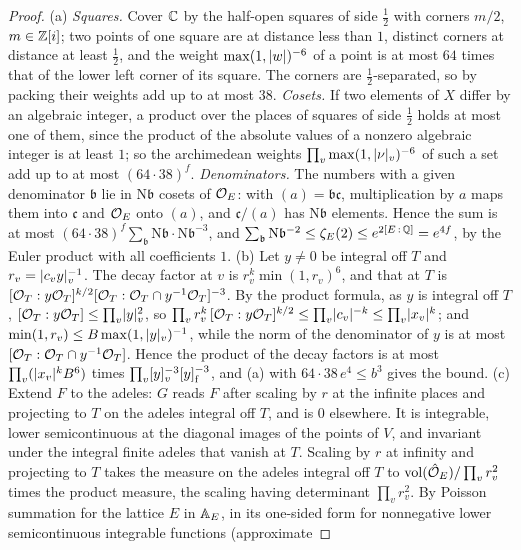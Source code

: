 \begin{proof}
(a) \emph{Squares.} Cover $\mathbb{C}$ by the half-open squares of side $\frac12$ with corners $m/2$, $m\in\mathbb{Z}[i]$; two points of one square are at distance less than $1$, distinct corners at distance at least $\frac12$, and the weight
$\max(1,\lvert w\rvert)^{-6}$ of a point is at most $64$ times that of the lower left corner of its square. The corners are $\frac12$-separated, so by packing their weights add up to at most $38$. \emph{Cosets.} If two elements of $X$
differ by an algebraic integer, a product over the places of squares of side $\frac12$ holds at most one of them, since the product of the absolute values of a nonzero algebraic integer is at least $1$; so the
archimedean weights $\prod_v\max(1,\lvert \nu\rvert_v)^{-6}$ of such a set add up to at most $(64\cdot38)^f$. \emph{Denominators.} The numbers with a given denominator $\mathfrak b$ lie in $\mathrm N\mathfrak b$ cosets of $\mathcal{O}_E$: with
$(a)=\mathfrak b\mathfrak c$, multiplication by $a$ maps them into $\mathfrak c$ and $\mathcal{O}_E$ onto $(a)$, and $\mathfrak c/(a)$ has $\mathrm N\mathfrak b$ elements. Hence the sum is at most $(64\cdot38)^f\sum_{\mathfrak b}\mathrm N\mathfrak b\cdot\mathrm N\mathfrak b^{-3}$, and
$\sum_{\mathfrak b}\mathrm N\mathfrak b^{-2}\le\zeta_E(2)\le e^{2[E\,{:}\,\mathbb{Q}]}=e^{4f}$, by the Euler product with all coefficients $1$.
(b) Let $y\ne0$ be integral off $T$ and $r_v=\lvert c_vy\rvert_v^{-1}$. The decay factor at $v$ is $r_v^k\min(1,r_v)^6$, and that at $T$ is $[\mathcal{O}_T:y\mathcal{O}_T]^{k/2}[\mathcal{O}_T:\mathcal{O}_T\cap y^{-1}\mathcal{O}_T]^{-3}$. By the product formula, as $y$ is integral off $T$,
$[\mathcal{O}_T:y\mathcal{O}_T]\le\prod_v\lvert y\rvert_v^2$, so $\prod_vr_v^k\,[\mathcal{O}_T:y\mathcal{O}_T]^{k/2}\le\prod_v\lvert c_v\rvert^{-k}\le\prod_v\lvert x_v\rvert^k$; and $\min(1,r_v)\le B\max(1,\lvert y\rvert_v)^{-1}$, while the norm of the denominator of $y$ is at most
$[\mathcal{O}_T:\mathcal{O}_T\cap y^{-1}\mathcal{O}_T]$. Hence the product of the decay factors is at most $\prod_v(\lvert x_v\rvert^kB^6)$ times $\prod_v[y]_v^{-3}[y]_{\rm f}^{-3}$, and (a) with $64\cdot38\,e^4\le b^3$ gives the bound.
(c) Extend $F$ to the adeles: $G$ reads $F$ after scaling by $r$ at the infinite places and projecting to $T$ on the adeles integral off $T$, and is $0$ elsewhere. It is integrable, lower semicontinuous at the diagonal images
of the points of $V$, and invariant under the integral finite adeles that vanish at $T$. Scaling by $r$ at infinity and projecting to $T$ takes the measure on the adeles integral off $T$ to $\operatorname{vol}(\hat{\mathcal{O}}_E)/\prod_vr_v^2$
times the product measure, the scaling having determinant $\prod_vr_v^2$. By Poisson summation for the lattice $E$ in $\mathbb{A}_E$, in its one-sided form for nonnegative lower semicontinuous integrable functions (approximate

\end{proof}
